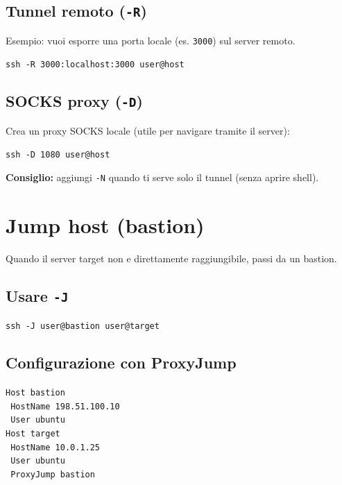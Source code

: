 \documentclass[a4paper,11pt]{article}
\begin{document}
\subsection{Tunnel remoto (\texttt{-R})}
Esempio: vuoi esporre una porta locale (es. \texttt{3000}) sul server remoto.
\begin{codebox}
\texttt{ssh -R 3000:localhost:3000 user@host}
\end{codebox}

\subsection{SOCKS proxy (\texttt{-D})}
Crea un proxy SOCKS locale (utile per navigare tramite il server):
\begin{codebox}
\texttt{ssh -D 1080 user@host}
\end{codebox}

\begin{tipbox}
\textbf{Consiglio:} aggiungi \texttt{-N} quando ti serve solo il tunnel (senza aprire shell).
\end{tipbox}

\section{Jump host (bastion)}
Quando il server target non e direttamente raggiungibile, passi da un bastion.

\subsection{Usare \texttt{-J}}
\begin{codebox}
\texttt{ssh -J user@bastion user@target}
\end{codebox}

\subsection{Configurazione con ProxyJump}
\begin{codebox}
\texttt{Host bastion} \\
\texttt{  HostName 198.51.100.10} \\
\texttt{  User ubuntu} \\
\texttt{Host target} \\
\texttt{  HostName 10.0.1.25} \\
\texttt{  User ubuntu} \\
\texttt{  ProxyJump bastion}
\end{codebox}
\end{document}
